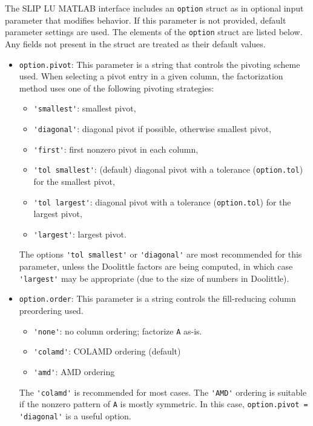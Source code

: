 \documentclass[12pt]{article}
\theoremstyle{definition}
\begin{document}
The SLIP LU MATLAB interface includes an \verb|option| struct as in optional
input parameter that modifies behavior.  If this parameter is not provided,
default parameter settings are used.  The elements of the \verb'option' struct
are listed below.  Any fields not present in the struct are treated as their
default values.

\begin{itemize}

\item \verb|option.pivot|: This parameter is a string that controls the
pivoting scheme used.  When selecting a pivot entry in a given column, the
factorization method uses one of the following pivoting strategies:

    \begin{itemize}
    \item \verb|'smallest'|: smallest pivot,
    \item \verb|'diagonal'|: diagonal pivot if possible, otherwise smallest pivot,
    \item \verb|'first'|: first nonzero pivot in each column,
    \item \verb|'tol smallest'|: (default) diagonal pivot with a tolerance (\verb|option.tol|)
        for the smallest pivot,
    \item \verb|'tol largest'|: diagonal pivot with a tolerance (\verb|option.tol|)
        for the largest pivot,
    \item \verb|'largest'|: largest pivot.
    \end{itemize}

The options \verb|'tol smallest'| or \verb|'diagonal'| are most recommended for
this parameter, unless the Doolittle factors are being computed, in which case
\verb|'largest'| may be appropriate (due to the size of numbers in Doolittle).

\item \verb|option.order|: This parameter is a string controls the
fill-reducing column preordering used.

    \begin{itemize}
    \item \verb|'none'|: no column ordering; factorize \verb'A' as-is.
    \item \verb|'colamd'|: COLAMD ordering (default)
    \item \verb|'amd'|: AMD ordering
    \end{itemize}

The \verb|'colamd'| is recommended for most cases.  The \verb|'AMD'| ordering
is suitable if the nonzero pattern of \verb'A' is mostly symmetric.  In this
case, \verb|option.pivot = 'diagonal'| is a useful option.


\end{itemize}
\end{document}
